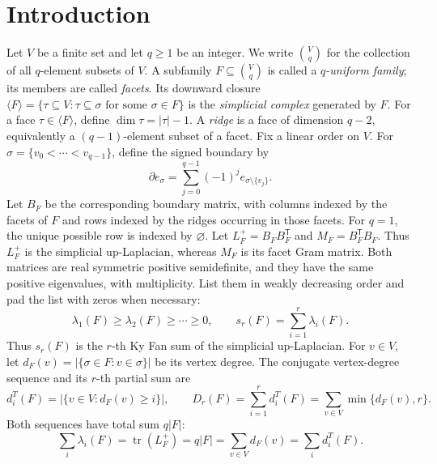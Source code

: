 \documentclass[11pt]{article}
\newcommand{\tr}{\operatorname{tr}}
\newcommand{\bd}{\partial}
\begin{document}
\section{Introduction}
\label{sec:introduction}
Let \(V\) be a finite set and let \(q\geq1\) be an integer. We write
\(\binom{V}{q}\) for the collection of all \(q\)-element subsets of \(V\).
A subfamily \(F\subseteq\binom{V}{q}\) is called a
\emph{\(q\)-uniform family}; its members are called \emph{facets}. Its
downward closure $\langle F\rangle=\{\tau\subseteq V:\tau\subseteq\sigma
\text{ for some }\sigma\in F\}$
is the \emph{simplicial complex} generated by \(F\).  For a face \(\tau\in\langle F\rangle\), define $\dim\tau=|\tau|-1.$
A \emph{ridge} is a face of dimension \(q-2\), equivalently a
\((q-1)\)-element subset of a facet.
Fix a linear order on \(V\).  For
\(\sigma=\{v_0<\cdots<v_{q-1}\}\), define the signed boundary by
\[
	\bd e_\sigma
	=
	\sum_{j=0}^{q-1}(-1)^j
	e_{\sigma\setminus\{v_j\}}.
\]
Let \(B_F\) be the corresponding boundary matrix, with columns indexed by
the facets of \(F\) and rows indexed by the ridges occurring in those
facets.  For \(q=1\), the unique possible row is indexed by
\(\varnothing\).  Let
$
L_F^+=B_FB_F^{\mathsf T}
$
and
$
M_F=B_F^{\mathsf T}B_F.
$
Thus \(L_F^+\) is the simplicial up-Laplacian, whereas \(M_F\) is its
facet Gram matrix. Both matrices are real symmetric positive semidefinite, and they have the same positive eigenvalues, with multiplicity.
List them in weakly decreasing order and pad the list with zeros when
necessary:
\[
	\lambda_1(F)\geq\lambda_2(F)\geq\cdots\geq0,
	\qquad
	s_r(F)=\sum_{i=1}^r\lambda_i(F).
\]
Thus \(s_r(F)\) is the \(r\)-th Ky Fan sum of the simplicial
up-Laplacian.
For \(v\in V\), let $d_F(v)=|\{\sigma\in F:v\in\sigma\}|$
be its vertex degree.  The conjugate vertex-degree sequence and its \(r\)-th partial sum are
\[
	d_i^T(F)=|\{v\in V:d_F(v)\geq i\}|,
	\qquad
	D_r(F)=\sum_{i=1}^r d_i^T(F)
	=
	\sum_{v\in V}\min\{d_F(v),r\}.
\]
Both sequences have total sum \(q|F|\):
\[
	\sum_i\lambda_i(F)
	=
	\tr(L_F^+)
	=
	q|F|
	=
	\sum_{v\in V}d_F(v)
	=
	\sum_i d_i^T(F).
\]
\end{document}
